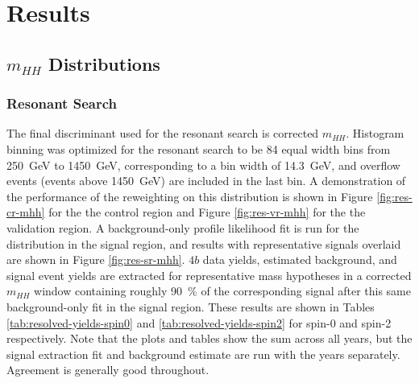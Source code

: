 \chapter{Results}
\label{chap:bbbb-results}

\section{$m_{HH}$ Distributions}
\subsection{Resonant Search}
The final discriminant used for the resonant search is corrected $m_{HH}$. Histogram binning was 
optimized for the resonant search to be 84 equal width bins from \SI{250}{\GeV} to \SI{1450}{\GeV}, 
corresponding to a bin width of \SI{14.3}{\GeV}, and overflow events (events above \SI{1450}{\GeV}) 
are included in the last bin. A demonstration of the performance of the reweighting on this 
distribution is shown in Figure \ref{fig:res-cr-mhh} for the the control region and Figure \ref{fig:res-vr-mhh} for 
the the validation region. A background-only profile likelihood fit is run for the distribution in the signal 
region, and results with representative signals overlaid are shown in Figure \ref{fig:res-sr-mhh}. $4b$ data yields, 
estimated background, and signal event yields are extracted for representative mass hypotheses in a 
corrected $m_{HH}$ window containing roughly 90~\% of the corresponding signal after this same background-only 
fit in the signal region. These results are shown in Tables \ref{tab:resolved-yields-spin0} and 
\ref{tab:resolved-yields-spin2} for spin-0 and spin-2 respectively. Note that 
the plots and tables show the sum across all years, but the signal extraction fit and background estimate are run with the 
years separately. Agreement is generally good throughout. 

